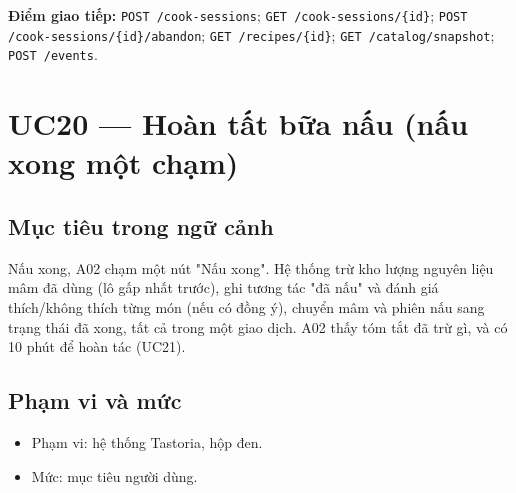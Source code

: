 \textbf{Điểm giao tiếp:} {\small\texttt{POST /\allowbreak{}\allowbreak{}cook-\allowbreak{}sessions}}; {\small\texttt{GET /\allowbreak{}\allowbreak{}cook-\allowbreak{}sessions/\allowbreak{}\allowbreak{}\{id\}}}; {\small\texttt{POST /\allowbreak{}\allowbreak{}cook-\allowbreak{}sessions/\allowbreak{}\allowbreak{}\{id\}/\allowbreak{}\allowbreak{}abandon}}; {\small\texttt{GET /\allowbreak{}\allowbreak{}recipes/\allowbreak{}\allowbreak{}\{id\}}}; {\small\texttt{GET /\allowbreak{}\allowbreak{}catalog/\allowbreak{}\allowbreak{}snapshot}}; {\small\texttt{POST /\allowbreak{}\allowbreak{}events}}.

\section{UC20 --- Hoàn tất bữa nấu (nấu xong một chạm)}
\subsection{Mục tiêu trong ngữ cảnh}
Nấu xong, A02 chạm một nút "Nấu xong". Hệ thống trừ kho lượng nguyên liệu mâm đã dùng (lô gấp nhất trước), ghi tương tác "đã nấu" và đánh giá thích/\allowbreak{}không thích từng món (nếu có đồng ý), chuyển mâm và phiên nấu sang trạng thái đã xong, tất cả trong một giao dịch. A02 thấy tóm tắt đã trừ gì, và có 10 phút để hoàn tác (UC21).

\subsection{Phạm vi và mức}
\begin{itemize}
\item Phạm vi: hệ thống Tastoria, hộp đen.
\item Mức: mục tiêu người dùng.
\end{itemize}
